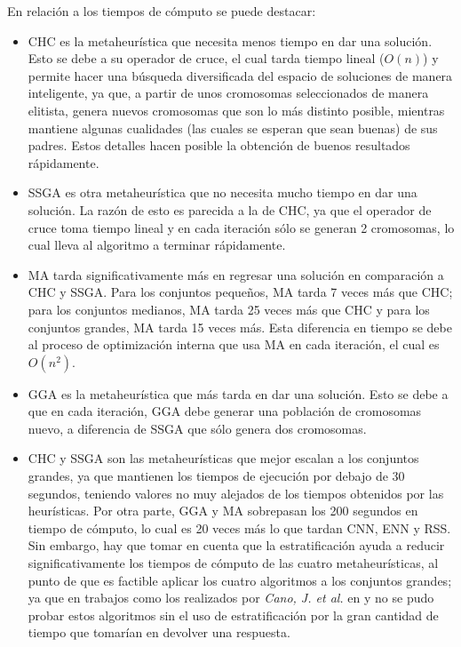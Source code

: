 En relación a los tiempos de cómputo se puede destacar:

\begin{itemize}

\item CHC es la metaheurística que necesita menos tiempo en dar una solución. Esto se debe a su operador de cruce, el cual tarda tiempo lineal ($O(n)$) y permite hacer una búsqueda diversificada del espacio de soluciones de manera inteligente, ya que, a partir de unos cromosomas seleccionados de manera elitista, genera nuevos cromosomas que son lo más distinto posible, mientras mantiene algunas cualidades (las cuales se esperan que sean buenas) de sus padres. Estos detalles hacen posible la obtención de buenos resultados rápidamente.

\item SSGA es otra metaheurística que no necesita mucho tiempo en dar una solución. La razón de esto es parecida a la de CHC, ya que el operador de cruce toma tiempo lineal y en cada iteración sólo se generan 2 cromosomas, lo cual lleva al algoritmo a terminar rápidamente.

\item MA tarda significativamente más en regresar una solución en comparación a CHC y SSGA. Para los conjuntos pequeños, MA tarda 7 veces más que CHC; para los conjuntos medianos, MA tarda 25 veces más que CHC y para los conjuntos grandes, MA tarda 15 veces más. Esta diferencia en tiempo se debe al proceso de optimización interna que usa MA en cada iteración, el cual es $O(n^2)$.

\item GGA es la metaheurística que más tarda en dar una solución. Esto se debe a que en cada iteración, GGA debe generar una población de cromosomas nuevo, a diferencia de SSGA que sólo genera dos cromosomas.

\item CHC y SSGA son las metaheurísticas que mejor escalan a los conjuntos grandes, ya que mantienen los tiempos de ejecución por debajo de 30 segundos, teniendo valores no muy alejados de los tiempos obtenidos por las heurísticas. Por otra parte, GGA y MA sobrepasan los 200 segundos en tiempo de cómputo, lo cual es 20 veces más lo que tardan CNN, ENN y RSS. Sin embargo, hay que tomar en cuenta que la estratificación ayuda a reducir significativamente los tiempos de cómputo de las cuatro metaheurísticas, al punto de que es factible aplicar los cuatro algoritmos a los conjuntos grandes; ya que en trabajos como los realizados por \emph{Cano, J. et al.} en \cite{garcia2008memetic} y \cite{garcia2012prototype} no se pudo probar estos algoritmos sin el uso de estratificación por la gran cantidad de tiempo que tomarían en devolver una respuesta.

\end{itemize}


